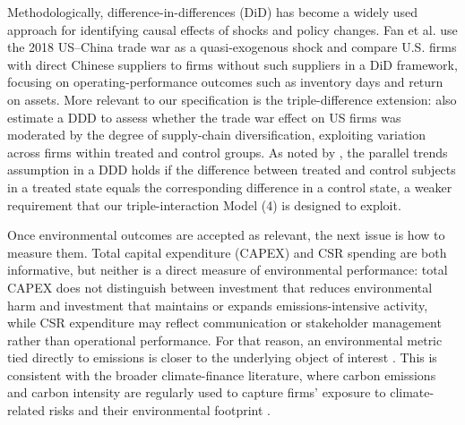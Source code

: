 \documentclass[12pt,a4paper]{article}
\begin{document}
Methodologically, difference-in-differences (DiD) has become a widely used approach for identifying causal effects of shocks and policy changes. Fan et al. use the 2018 US–China trade war as a quasi-exogenous shock and compare U.S. firms with direct Chinese suppliers to firms without such suppliers in a DiD framework, focusing on operating-performance outcomes such as inventory days and return on assets.
More relevant to our specification is the triple-difference extension: \citet{fan2022} also estimate a DDD to assess whether the trade war effect on US firms was moderated by the degree of supply-chain diversification, exploiting variation across firms within treated and control groups. As noted by \citet{olden2022}, the parallel trends assumption in a DDD holds if the difference between treated and control subjects in a treated state equals the corresponding difference in a control state, a weaker requirement that our triple-interaction Model (4) is designed to exploit.

Once environmental outcomes are accepted as relevant, the next issue is how to measure them. Total capital expenditure (CAPEX) and CSR spending are both informative, but neither is a direct measure of environmental performance: total CAPEX does not distinguish between investment that reduces environmental harm and investment that maintains or expands emissions-intensive activity, while CSR expenditure may reflect communication or stakeholder management rather than operational performance. For that reason, an environmental metric tied directly to emissions is closer to the underlying object of interest \citep{abdullah2024}. This is consistent with the broader climate-finance literature, where carbon emissions and carbon intensity are regularly used to capture firms' exposure to climate-related risks and their environmental footprint \citep{sautner2023, bolton2023, perdichizzi2024}.
\end{document}
